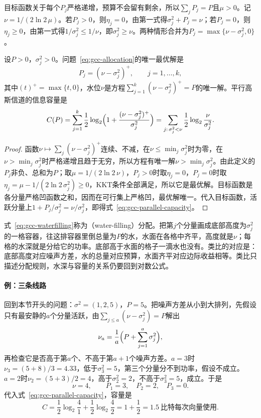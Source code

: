 目标函数关于每个$P_j$严格递增，预算不会留有剩余，所以$\sum_jP_j=P$且$\mu>0$。记$\nu=1/(2\ln2\,\mu)$。若$P_j>0$，则$\eta_j=0$，由第一式得$\sigma_j^2+P_j=\nu$；若$P_j=0$，则$\eta_j\geq0$，由第一式得$1/\sigma_j^2\leq1/\nu$，即$\sigma_j^2\geq\nu$。两种情形合并为$P_j=\max\{\nu-\sigma_j^2,0\}$。

\begin{theorem}[注水分配]
\label{thm:gcc-waterfilling}
设$P>0$，$\sigma_j^2>0$。问题~\eqref{eq:gcc-allocation}的唯一最优解是
\begin{equation}
 P_j=(\nu-\sigma_j^2)^{+},\qquad j=1,\dots,k,
 \label{eq:gcc-waterfilling}
\end{equation}
其中$(t)^{+}=\max\{t,0\}$，水位$\nu$是方程$\sum_{j=1}^{k}(\nu-\sigma_j^2)^{+}=P$的唯一解。平行高斯信道的信息容量是
\begin{equation}
 C(P)=\sum_{j=1}^{k}\frac12\log_2\Bigl(1+\frac{(\nu-\sigma_j^2)^{+}}{\sigma_j^2}\Bigr)
 =\sum_{j:\,\sigma_j^2<\nu}\frac12\log_2\frac{\nu}{\sigma_j^2} .
 \label{eq:gcc-parallel-capacity}
\end{equation}
\end{theorem}

\begin{proof}
函数$\nu\mapsto\sum_j(\nu-\sigma_j^2)^{+}$连续、不减，在$\nu\leq\min_j\sigma_j^2$时为零，在$\nu>\min_j\sigma_j^2$时严格递增且趋于无穷，所以方程有唯一解$\nu>\min_j\sigma_j^2$。由此定义的$P_j$非负、总和为$P$；取$\mu=1/(2\ln2\,\nu)$，$P_j>0$时取$\eta_j=0$，$P_j=0$时取$\eta_j=\mu-1/(2\ln2\,\sigma_j^2)\geq0$，KKT条件全部满足，所以它是最优解。目标函数是各分量严格凹函数之和，因而在可行集上严格凹，最优解唯一。代入目标函数，活跃分量上$1+P_j/\sigma_j^2=\nu/\sigma_j^2$，即得式~\eqref{eq:gcc-parallel-capacity}。
\end{proof}

式~\eqref{eq:gcc-waterfilling}称为（water-filling）分配。把第$j$个分量画成底部高度为$\sigma_j^2$的一格容器，往这排容器里倒总量为$P$的水，水面在各格中齐平，高度就是$\nu$；每格的水深就是分给它的功率。底部高于水面的格子一滴水也没有。类比的对应是：底部高度对应噪声方差，水的总量对应预算，水面齐平对应边际收益相等。类比只描述分配规则，水深与容量的关系仍要回到对数公式。

\paragraph{例：三条线路}
回到本节开头的问题：$\sigma^2=(1,2,5)$，$P=5$。把噪声方差从小到大排列，先假设只有最安静的$a$个分量活跃，由$\sum_{j\leq a}(\nu-\sigma_j^2)=P$解出
\[
 \nu_a=\frac{1}{a}\Bigl(P+\sum_{j=1}^{a}\sigma_j^2\Bigr),
\]
再检查它是否高于第$a$个、不高于第$a+1$个噪声方差。$a=3$时$\nu_3=(5+8)/3=4.33$，低于$\sigma_3^2=5$，第三个分量分不到功率，假设不成立。$a=2$时$\nu_2=(5+3)/2=4$，高于$\sigma_2^2=2$，不高于$\sigma_3^2=5$，成立。于是
\[
 \nu=4,\qquad P_1=3,\quad P_2=2,\quad P_3=0 .
\]
代入式~\eqref{eq:gcc-parallel-capacity}，容量是
\[
 C=\frac12\log_2\frac41+\frac12\log_2\frac42=1+\frac12=1.5\ \text{比特每次向量使用}.
\]

